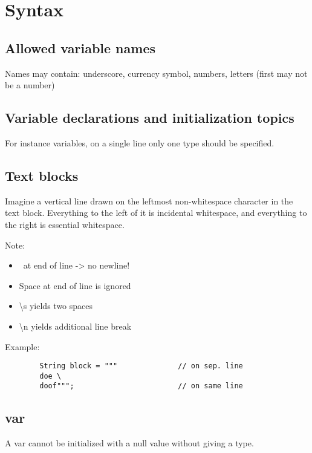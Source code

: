 \documentclass{scrartcl}
\begin{document}
\section{Syntax}
\subsection{Allowed variable names}

    Names may contain: underscore, currency symbol, numbers, letters (first may not be a number)

\subsection{Variable declarations and initialization topics}

    For instance variables, on a single line only one type should be specified.



\subsection{Text blocks}

    Imagine a vertical line drawn on the leftmost non-­whitespace character in the text block. Everything to the left of it is incidental whitespace, and everything to the right is essential whitespace.

    Note:
    \begin{itemize}
        \item \ at end of line -> no newline!
        \item Space at end of line is ignored
        \item \textbackslash s yields two spaces
        \item  \textbackslash n yields additional line break
    \end{itemize}

    Example:

    \begin{lstlisting}
        String block = """              // on sep. line
        doe \
        doof""";                        // on same line
    \end{lstlisting}

\subsection{var}

    A var cannot be initialized with a null value without giving a type.
\end{document}
